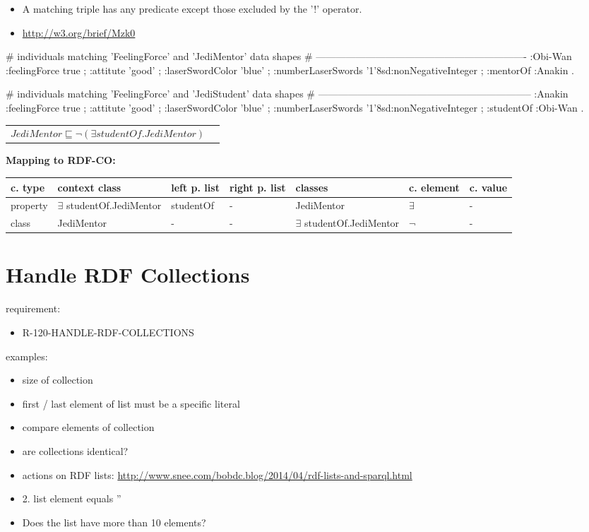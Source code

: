 \documentclass{llncs}
\newenvironment{gcotable}{
  \scriptsize
  \sffamily
  \vspace{0cm}
	\begin{center}
	\textbf{\vspace{0.4cm}Mapping to RDF-CO:} \\
  \begin{tabular}{l|l|l|l|l|l|l}
	\hline
  \textbf{c. type} & \textbf{context class} & \textbf{left p. list} & \textbf{right p. list} & \textbf{classes} & \textbf{c. element} & \textbf{c. value} \\
  \hline

}{
  \hline
  \end{tabular}
	\end{center}
}
\newenvironment{DL}{
  \vspace{0cm}
	\begin{center}
  \begin{tabular}{r l}

}{
  \end{tabular}
	\end{center}
}
\begin{document}
\begin{itemize}
	\item A matching triple has any predicate except those excluded by the '!' operator.
  \item \url{http://w3.org/brief/Mzk0}
\end{itemize}

\begin{ex}
# individuals matching 'FeelingForce' and 'JediMentor' data shapes
# ----------------------------------------------------------------
:Obi-Wan 
    :feelingForce true ;
    :attitute 'good' ;
    :laserSwordColor 'blue' ;
    :numberLaserSwords '1'^^xsd:nonNegativeInteger ;
    :mentorOf :Anakin .
\end{ex}

\begin{ex}
# individuals matching 'FeelingForce' and 'JediStudent' data shapes
# -----------------------------------------------------------------
:Anakin 
    :feelingForce true ;
    :attitute 'good' ;
    :laserSwordColor 'blue' ;
    :numberLaserSwords '1'^^xsd:nonNegativeInteger ;
    :studentOf :Obi-Wan .
\end{ex}

\begin{DL}
$JediMentor \sqsubseteq \neg(\exists studentOf.JediMentor)$
\end{DL}

\begin{gcotable}
property & $\exists$ studentOf.JediMentor & studentOf & - & JediMentor & $\exists$ & - \\
class & JediMentor & - & - & $\exists$ studentOf.JediMentor & $\neg$ & - \\
\end{gcotable}

\section{Handle RDF Collections}

requirement:

\begin{itemize}
	\item R-120-HANDLE-RDF-COLLECTIONS
\end{itemize}

examples:

\begin{itemize}
	\item size of collection
	\item first / last element of list must be a specific literal
	\item compare elements of collection
	\item are collections identical?
	\item actions on RDF lists: \url{http://www.snee.com/bobdc.blog/2014/04/rdf-lists-and-sparql.html}
	\item 2. list element equals ''
	\item Does the list have more than 10 elements?
\end{itemize}
\end{document}
